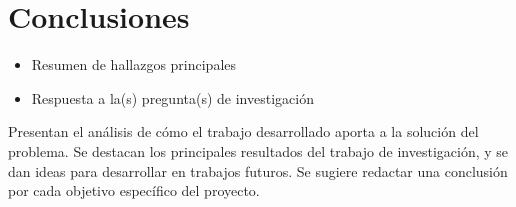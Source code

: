 \chapter{Conclusiones}

\begin{itemize}
    \item Resumen de hallazgos principales
    \item Respuesta a la(s) pregunta(s) de investigación
\end{itemize}

Presentan el análisis de cómo el trabajo desarrollado aporta a la solución del problema. Se destacan los principales resultados del trabajo de investigación, y se dan ideas para desarrollar en trabajos futuros. Se sugiere redactar una conclusión por cada objetivo específico del proyecto.
